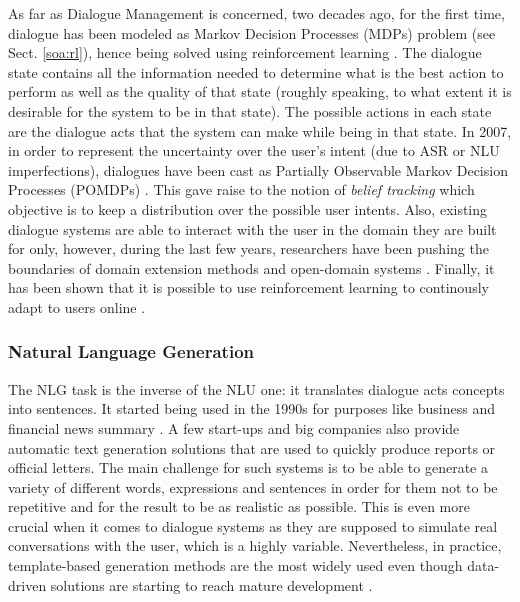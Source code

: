                         As far as Dialogue Management is concerned, two decades ago, for the first time, dialogue has been modeled as Markov Decision Processes (MDPs) problem (see Sect. \ref{soa:rl}), hence being solved using reinforcement learning \cite{Levin1997a}. The dialogue state contains all the information needed to determine what is the best action to perform as well as the quality of that state (roughly speaking, to what extent it is desirable for the system to be in that state). The possible actions in each state are the dialogue acts that the system can make while being in that state. In 2007, in order to represent the uncertainty over the user's intent (due to ASR or NLU imperfections), dialogues have been cast as Partially Observable Markov Decision Processes (POMDPs) \cite{Roy2000,Williams2007}. This gave raise to the notion of \textit{belief tracking} which objective is to keep a distribution over the possible user intents. Also, existing dialogue systems are able to interact with the user in the domain they are built for only, however, during the last few years, researchers have been pushing the boundaries of domain  extension methods \cite{Gasic2013} and open-domain systems \cite{Pakucs2003,Galibert2005,EkeinhorKomi2014,Wang2014}. Finally, it has been shown that it is possible to use reinforcement learning to continously adapt to users online \cite{Ferreira2015c,Chandramohan2012a,Chandramohan2012b}.
                        
                        \subsubsection{Natural Language Generation}
                        
                        The NLG task is the inverse of the NLU one: it translates dialogue acts concepts into sentences. It started being used in the 1990s for purposes like business and financial news summary \cite{Anand1992}. A few start-ups and big companies also provide automatic text generation solutions that are used to quickly produce reports or official letters. The main challenge for such systems is to be able to generate a variety of different words, expressions and sentences in order for them not to be repetitive and for the result to be as realistic as possible. This is even more crucial when it comes to dialogue systems as they are supposed to simulate real conversations with the user, which is a highly variable. Nevertheless, in practice, template-based generation methods are the most widely used even though data-driven solutions are starting to reach mature development \cite{Mairesse2010,Mitchell2014,Manishina2016}.
                        
